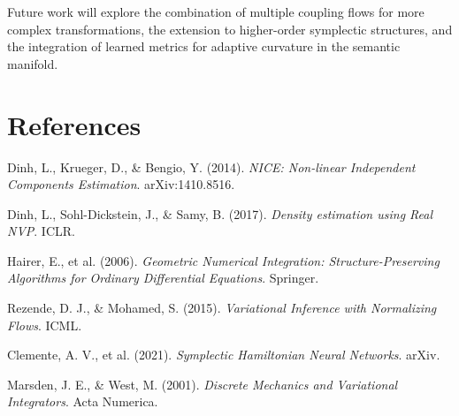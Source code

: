 \documentclass[12pt,a4paper]{article}
\begin{document}
Future work will explore the combination of multiple coupling flows for more complex transformations, the extension to higher-order symplectic structures, and the integration of learned metrics for adaptive curvature in the semantic manifold.

\vfill

\section*{References}

\begin{enumerate}[leftmargin=1.5cm, label={[\arabic*]}]
\item Dinh, L., Krueger, D., \& Bengio, Y. (2014). \textit{NICE: Non-linear Independent Components Estimation}. arXiv:1410.8516.

\item Dinh, L., Sohl-Dickstein, J., \& Samy, B. (2017). \textit{Density estimation using Real NVP}. ICLR.

\item Hairer, E., et al. (2006). \textit{Geometric Numerical Integration: Structure-Preserving Algorithms for Ordinary Differential Equations}. Springer.

\item Rezende, D. J., \& Mohamed, S. (2015). \textit{Variational Inference with Normalizing Flows}. ICML.

\item Clemente, A. V., et al. (2021). \textit{Symplectic Hamiltonian Neural Networks}. arXiv.

\item Marsden, J. E., \& West, M. (2001). \textit{Discrete Mechanics and Variational Integrators}. Acta Numerica.
\end{enumerate}
\end{document}
